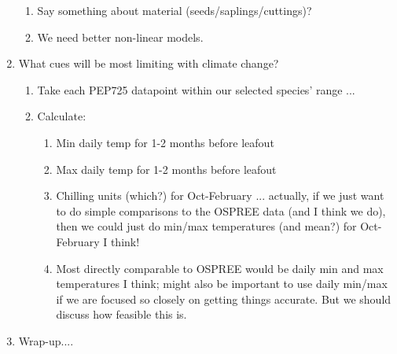 \documentclass[11pt,letterpaper]{article}
\renewcommand{\section}[1]{%
\bigskip
\begin{center}
\begin{Large}
\normalfont\scshape #1
\medskip
\end{Large}
\end{center}}
\begin{document}
\begin{enumerate}
\begin{enumerate}
\item Say something about material (seeds/saplings/cuttings)?
\item We need better non-linear models.
\end{enumerate}
\item What cues will be most limiting with climate change?
\begin{enumerate}
\item Take each PEP725 datapoint within our selected species' range ... 
\item Calculate: 
\begin{enumerate}
\item Min daily temp for 1-2 months before leafout
\item Max daily temp for 1-2 months before leafout
\item Chilling units (which?) for Oct-February ... actually, if we just want to do simple comparisons to the OSPREE data (and I think we do), then we could just do min/max temperatures (and mean?) for Oct-February I think!
\item Most directly comparable to OSPREE would be daily min and max temperatures I think; might also be important to use daily min/max if we are focused so closely on getting things accurate. But we should discuss how feasible this is. 
\end{enumerate}
\end{enumerate}
\item Wrap-up....
\end{enumerate}






%
%
\end{document}
